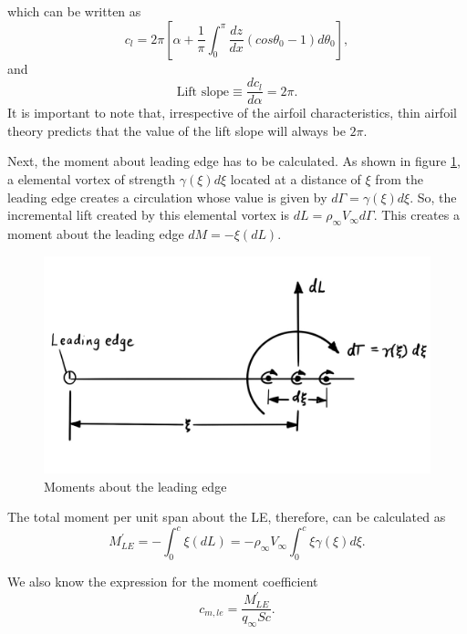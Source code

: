 \documentclass[letterpaper,12pt]{article}
\begin{document}
which can be written as
\begin{equation}
\boxed{
c_l = 2\pi \left[\alpha + \frac{1}{\pi}\int_0^\pi \frac{dz}{dx}(cos\theta_0 - 1) d\theta_0\right],
}
\end{equation}
and
\begin{equation}
\boxed{
\text{Lift slope} \equiv \frac{dc_l}{d\alpha} = 2\pi.
}
\end{equation}
It is important to note that, irrespective of the airfoil characteristics, thin airfoil theory predicts that the value of the lift slope will always be $2\pi$.

Next, the moment about leading edge has to be calculated. As shown in figure \ref{LE-moment}, a elemental vortex of strength $\gamma(\xi)d\xi$ located at a distance of $\xi$ from the leading edge creates a circulation whose value is given by $d\Gamma = \gamma(\xi)d\xi$. So, the incremental lift created by this elemental vortex is $dL = \rho_\infty V_\infty d\Gamma$. This creates a moment about the leading edge $dM = -\xi(dL)$. 

\begin{figure}[h]
\includegraphics[scale=0.4]{1.5_moment_LE}
\centering
\caption{Moments about the leading edge}
\label{LE-moment}
\end{figure}

The total moment per unit span about the LE, therefore, can be calculated as
\begin{equation}
M_{LE}^{'} = -\int_0^c\xi(dL) = -\rho_\infty V_\infty \int_0^c\xi\gamma(\xi)d\xi.
\end{equation}

We also know the expression for the moment coefficient
\begin{equation}
c_{m,le} = \frac{M_{LE}^{'}}{q_{\infty}Sc}.
\end{equation}
\end{document}

